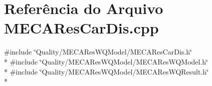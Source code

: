 \section{Referência do Arquivo M\+E\+C\+A\+Res\+Car\+Dis.\+cpp}
\label{_m_e_c_a_res_car_dis_8cpp}
{\ttfamily \#include \char`\"{}Quality/\+M\+E\+C\+A\+Res\+W\+Q\+Model/\+M\+E\+C\+A\+Res\+Car\+Dis.\+h\char`\"{}}\\*
{\ttfamily \#include \char`\"{}Quality/\+M\+E\+C\+A\+Res\+W\+Q\+Model/\+M\+E\+C\+A\+Res\+W\+Q\+Model.\+h\char`\"{}}\\*
{\ttfamily \#include \char`\"{}Quality/\+M\+E\+C\+A\+Res\+W\+Q\+Model/\+M\+E\+C\+A\+Res\+W\+Q\+Result.\+h\char`\"{}}\\*

